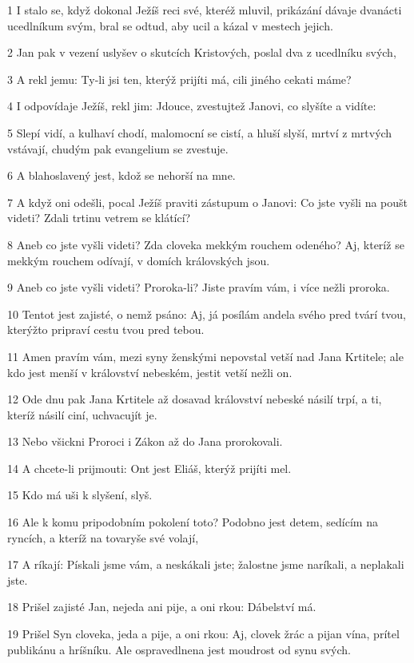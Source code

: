\par 1 I stalo se, když dokonal Ježíš reci své, kteréž mluvil, prikázání dávaje dvanácti ucedlníkum svým, bral se odtud, aby ucil a kázal v mestech jejich.
\par 2 Jan pak v vezení uslyšev o skutcích Kristových, poslal dva z ucedlníku svých,
\par 3 A rekl jemu: Ty-li jsi ten, kterýž prijíti má, cili jiného cekati máme?
\par 4 I odpovídaje Ježíš, rekl jim: Jdouce, zvestujtež Janovi, co slyšíte a vidíte:
\par 5 Slepí vidí, a kulhaví chodí, malomocní se cistí, a hluší slyší, mrtví z mrtvých vstávají, chudým pak evangelium se zvestuje.
\par 6 A blahoslavený jest, kdož se nehorší na mne.
\par 7 A když oni odešli, pocal Ježíš praviti zástupum o Janovi: Co jste vyšli na poušt videti? Zdali trtinu vetrem se klátící?
\par 8 Aneb co jste vyšli videti? Zda cloveka mekkým rouchem odeného? Aj, kteríž se mekkým rouchem odívají, v domích královských jsou.
\par 9 Aneb co jste vyšli videti? Proroka-li? Jiste pravím vám, i více nežli proroka.
\par 10 Tentot jest zajisté, o nemž psáno: Aj, já posílám andela svého pred tvárí tvou, kterýžto pripraví cestu tvou pred tebou.
\par 11 Amen pravím vám, mezi syny ženskými nepovstal vetší nad Jana Krtitele; ale kdo jest menší v království nebeském, jestit vetší nežli on.
\par 12 Ode dnu pak Jana Krtitele až dosavad království nebeské násilí trpí, a ti, kteríž násilí ciní, uchvacujít je.
\par 13 Nebo všickni Proroci i Zákon až do Jana prorokovali.
\par 14 A chcete-li prijmouti: Ont jest Eliáš, kterýž prijíti mel.
\par 15 Kdo má uši k slyšení, slyš.
\par 16 Ale k komu pripodobním pokolení toto? Podobno jest detem, sedícím na ryncích, a kteríž na tovaryše své volají,
\par 17 A ríkají: Pískali jsme vám, a neskákali jste; žalostne jsme naríkali, a neplakali jste.
\par 18 Prišel zajisté Jan, nejeda ani pije, a oni rkou: Dábelství má.
\par 19 Prišel Syn cloveka, jeda a pije, a oni rkou: Aj, clovek žrác a pijan vína, prítel publikánu a hríšníku. Ale ospravedlnena jest moudrost od synu svých.
